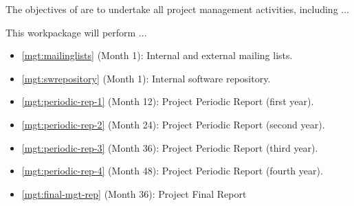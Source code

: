 \addtocounter{wpno}{1}

\begin{Workpackage}{\thewpno}
\WPTitle{\wpname{\thewpno}}

\begin{WPObjectives}
The objectives of \theWP{} are to undertake all project management activities, including ...

\end{WPObjectives}

\begin{WPDescription}
This workpackage will perform ...
\end{WPDescription}

\begin{WPDeliverables}
\begin{itemize}
\item
\ref{mgt:mailinglists}
(Month 1): 
Internal and external mailing lists.
\item
\ref{mgt:swrepository}
(Month 1): 
Internal software repository.
\item
\ref{mgt:periodic-rep-1}
(Month 12): 
Project Periodic Report (first year).
\item
\ref{mgt:periodic-rep-2}
 (Month 24): 
Project Periodic Report (second year).
\item
\ref{mgt:periodic-rep-3}
(Month 36): 
Project Periodic Report (third year).
\item
\ref{mgt:periodic-rep-4}
(Month 48): 
Project Periodic Report (fourth year).
\item
\ref{mgt:final-mgt-rep}
(Month 36): 
Project Final Report
\end{itemize}
\end{WPDeliverables}
\end{Workpackage}
